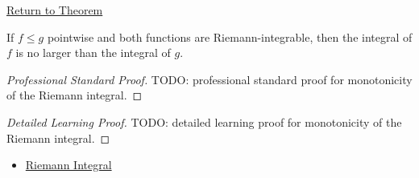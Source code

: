 \newpage
{}
\label{prf:riemann-integral-monotonicity}

\begin{remark*}[Return]
\hyperref[thm:riemann-integral-monotonicity]{Return to Theorem}
\end{remark*}

\begin{theorem*}
If \(f\le g\) pointwise and both functions are Riemann-integrable, then the
integral of \(f\) is no larger than the integral of \(g\).
\end{theorem*}

\begin{proof}[Professional Standard Proof]
\LRAProofBodyStart
TODO: professional standard proof for monotonicity of the Riemann integral.
\end{proof}

\begin{proof}[Detailed Learning Proof]
\LRAProofBodyStart
TODO: detailed learning proof for monotonicity of the Riemann integral.
\end{proof}

\begin{remark*}
\end{remark*}

\begin{dependencies}
\begin{itemize}
  \item \hyperref[def:riemann-integral]{Riemann Integral}
\end{itemize}
\end{dependencies}

\clearpage
